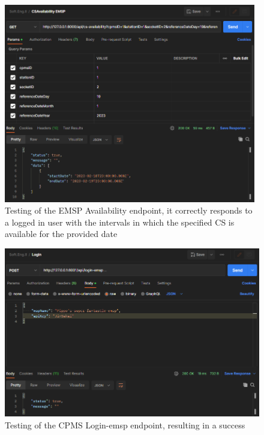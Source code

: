 \documentclass[11pt]{article}
\begin{document}
\begin{enumerate}
    \begin{figure}[!ht]
        \centering
        \includegraphics[width=110mm]{Availability.PNG}
        \captionsetup{justification=centering,margin=2cm}
        \caption{Testing of the EMSP Availability endpoint, it correctly responds to a logged in user with the intervals in which the specified CS is available for the provided date}
        \label{fig:my_label}
    \end{figure}
    
    \newpage
    
    \begin{figure}[!ht]
        \centering
        \includegraphics[width=120mm]{LoginCPMS.PNG}
        \captionsetup{justification=centering,margin=2cm}
        \caption{Testing of the CPMS Login-emsp endpoint, resulting in a success}
        \label{fig:my_label}
    \end{figure}
    

\end{enumerate}
\end{document}
